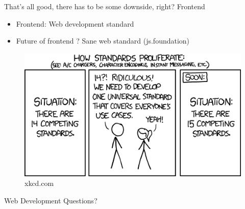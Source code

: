 \documentclass{beamer}
\begin{document}
    \begin{frame}{That's all good, there has to be some downside, right?}
  	\pause
	Frontend
	\pause
	\begin{itemize}[<+->]
		\item Frontend: Web development standard
		\item Future of frontend ? \pause Sane web standard (js.foundation)
  	\end{itemize}
	\pause
	\begin{center}
		\begin{figure}
		\includegraphics[scale=0.485]{images/standards.png}
		\caption{xkcd.com}
		\end{figure}
	\end{center}
  \end{frame}
  
  
  \begin{frame}{Web Development}
	Questions?

  \end{frame}
  
\end{document}
